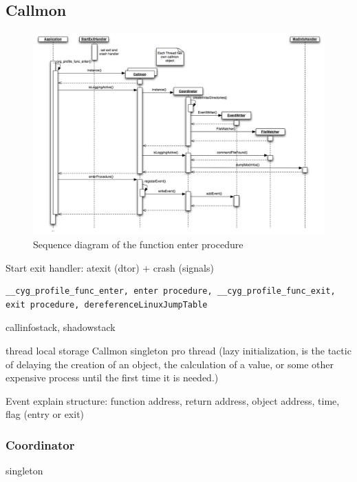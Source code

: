 
\subsection{Callmon}

\begin{figure}[ht]
\centering
\includegraphics[width=18cm]{images/callmon_sequence_diagram.png}
\caption{Sequence diagram of the function enter procedure}
\end{figure}

Start exit handler: atexit (dtor) + crash (signals)

\begin{verbatim}
__cyg_profile_func_enter, enter procedure, __cyg_profile_func_exit, 
exit procedure, dereferenceLinuxJumpTable
\end{verbatim}

callinfostack, shadowstack

thread local storage
Callmon singleton pro thread (lazy initialization, is the tactic of delaying the creation of an object, the calculation of a value, or some other expensive process until the first time it is needed.)

Event explain structure:
function address, return address, object address, time, flag (entry or exit)

\subsubsection{Coordinator}

singleton


